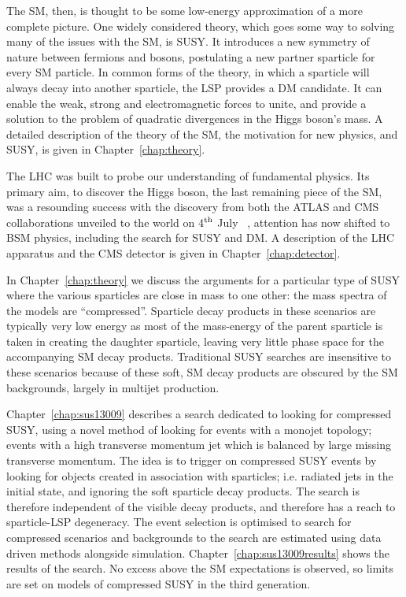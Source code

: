 The \ac{SM}, then, is thought to be some low-energy approximation of a more complete picture.
One widely considered theory, which goes some way to solving many of the issues with the \ac{SM}, is \ac{SUSY}.
It introduces a new symmetry of nature between fermions and bosons, postulating a new partner sparticle for every \ac{SM} particle. 
In common forms of the theory, in which a sparticle will always decay into another sparticle, the \ac{LSP} provides a \ac{DM} candidate. 
It can enable the weak, strong and electromagnetic forces to unite, and provide a solution to the problem of quadratic divergences in the Higgs boson's mass. 
A detailed description of the theory of the \ac{SM}, the motivation for new physics, and \ac{SUSY}, is given in Chapter~\ref{chap:theory}.

The LHC was built to probe our understanding of fundamental physics. 
Its primary aim, to discover the Higgs boson, the last remaining piece of the \ac{SM}, was a resounding success with the discovery  from both the \ac{ATLAS} and \ac{CMS} collaborations unveiled to the world on 4$^{\rm th}$ July ~\cite{Aad:2012tfa,Chatrchyan:2012ufa},   
 attention has now shifted to \ac{BSM} physics, including the search for \ac{SUSY} and \ac{DM}. 
A description of the LHC apparatus and the \ac{CMS} detector is given in Chapter~\ref{chap:detector}.

In Chapter~\ref{chap:theory} we discuss the arguments for a particular type of \ac{SUSY} where the various sparticles are close in mass to one other: the mass spectra of the models are ``compressed''. 
Sparticle decay products in these scenarios are typically very low energy as most of the mass-energy of the parent sparticle is taken in creating the daughter sparticle, leaving very little phase space for the accompanying \ac{SM} decay products.
Traditional \ac{SUSY} searches are insensitive to these scenarios because of these soft, \ac{SM} decay products are obscured by the \ac{SM} backgrounds, largely in multijet production. 

Chapter~\ref{chap:sus13009} describes a search dedicated to looking for compressed \ac{SUSY}, using a novel method of looking for events with a monojet topology; events with a high transverse momentum jet which is balanced by large missing transverse momentum. 
The idea is to trigger on compressed \ac{SUSY} events by looking for objects created in association with sparticles; i.e. radiated jets in the initial state, and ignoring the soft sparticle decay products.
The search is therefore independent of the visible decay products, and therefore has a reach to sparticle-\ac{LSP} degeneracy.
The event selection is optimised to search for compressed scenarios and backgrounds to the search are estimated using data driven methods alongside simulation.
Chapter~\ref{chap:sus13009results} shows the results of the search. No excess above the \ac{SM} expectations is observed, so limits are set on models of compressed \ac{SUSY} in the third generation.


